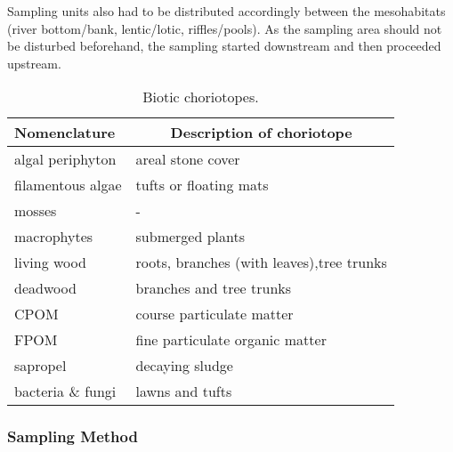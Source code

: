 Sampling units also had to be distributed accordingly between the mesohabitats (river bottom/bank, lentic/lotic, riffles/pools). As the sampling area should not be disturbed beforehand, the sampling started downstream and then proceeded upstream.





\begin{table}[!htb]                                 %
  \centering
  \small                                                       %
  \caption{Biotic choriotopes.}
    \begin{tabular}{ l l }
  \toprule
    Nomenclature  &
    \multicolumn{1}{c}{Description of choriotope} \\
  \hline
  \hline
    algal periphyton    & areal stone cover\\
    filamentous algae   & tufts or floating mats\\
    mosses              & -\\
    macrophytes         & submerged plants\\
    living wood         & roots, branches (with leaves),\newline tree trunks\\
    deadwood            & branches and tree trunks\\
    CPOM                & course particulate matter\\
    FPOM                & fine particulate organic matter\\
    sapropel            & decaying sludge\\
    bacteria \& fungi   & lawns and tufts\\
  \bottomrule
    \end{tabular}
  \label{tab:choriotope_biotic}%
\end{table}%










\subsubsection{Sampling Method}\label{sec:sampling_method}          %

